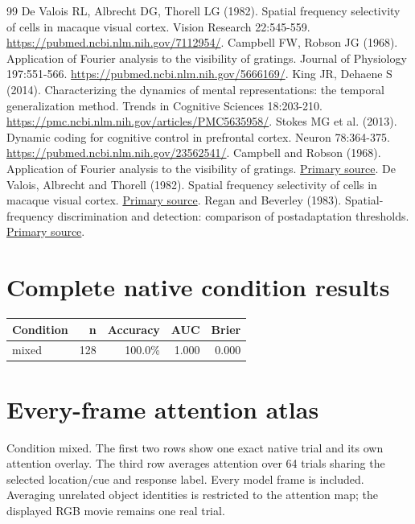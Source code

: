 \documentclass[11pt]{article}
\begin{document}
\begin{thebibliography}{99}
 De Valois RL, Albrecht DG, Thorell LG (1982). Spatial frequency selectivity of cells in macaque visual cortex. Vision Research 22:545-559. \url{https://pubmed.ncbi.nlm.nih.gov/7112954/}.
 Campbell FW, Robson JG (1968). Application of Fourier analysis to the visibility of gratings. Journal of Physiology 197:551-566. \url{https://pubmed.ncbi.nlm.nih.gov/5666169/}.
 King JR, Dehaene S (2014). Characterizing the dynamics of mental representations: the temporal generalization method. Trends in Cognitive Sciences 18:203-210. \url{https://pmc.ncbi.nlm.nih.gov/articles/PMC5635958/}.
 Stokes MG et al. (2013). Dynamic coding for cognitive control in prefrontal cortex. Neuron 78:364-375. \url{https://pubmed.ncbi.nlm.nih.gov/23562541/}.
 Campbell and Robson (1968). Application of Fourier analysis to the visibility of gratings. \href{https://doi.org/10.1113/jphysiol.1968.sp008574}{Primary source}.
 De Valois, Albrecht and Thorell (1982). Spatial frequency selectivity of cells in macaque visual cortex. \href{https://pubmed.ncbi.nlm.nih.gov/7112954/}{Primary source}.
 Regan and Beverley (1983). Spatial-frequency discrimination and detection: comparison of postadaptation thresholds. \href{https://pubmed.ncbi.nlm.nih.gov/6663371/}{Primary source}.
\end{thebibliography}\clearpage\appendix\section{Complete native condition results}
\small\begin{longtable}{p{}rrrr}\toprule Condition & n & Accuracy & AUC & Brier\\\midrule\endhead
mixed & 128 & 100.0\% & 1.000 & 0.000\\
\bottomrule\end{longtable}\normalsize\section{Every-frame attention atlas}
Condition mixed. The first two rows show one exact native trial and its own attention overlay. The third row averages attention over 64 trials sharing the selected location/cue and response label. Every model frame is included. Averaging unrelated object identities is restricted to the attention map; the displayed RGB movie remains one real trial.
\end{document}
